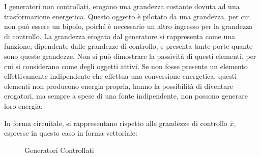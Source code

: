 \documentclass{article}
\numberwithin{equation}{subsection}
\begin{document}
I generatori non controllati, erogano una grandezza costante dovuta ad una trasformazione energetica. Questo oggetto è pilotato da una grandezza, per cui non può essere 
un bipolo, poiché è necessario un altro ingresso per la grandezza di controllo. La grandezza erogata dal generatore si rappresenta come una funzione, dipendente dalle 
grandezze di controllo, e presenta tante porte quante sono queste grandezze. Non si può dimostrare la passività di questi elementi, per cui si considerano come degli oggetti 
attivi. 
Se non fosse presente un elemento effettivamente indipendente che effettua una conversione energetica, questi elementi non producono energia propria, hanno la possibilità di 
diventare erogatori, ma sempre a spese di una fonte indipendente, non possono generare loro energia. 


In forma circuitale, si rappresentano rispetto alle grandezze di controllo $\overline{x}$, espresse in questo caso in forma vettoriale: 
\begin{figure}[H]%
    \centering
    \qquad
    \caption{Generatori Controllati}
    \label{fig:generatori-controllati}
\end{figure}
\end{document}
